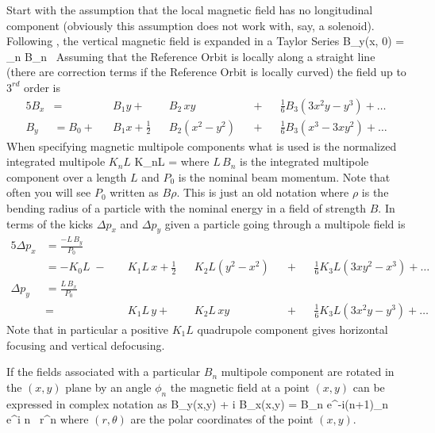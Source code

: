 Start with the assumption that the local magnetic field has no
longitudinal component (obviously this assumption does not work with,
say, a solenoid).  Following \mad, the vertical magnetic field is
expanded in a Taylor Series
\Begineq
  B_y(x, 0) = \sum_n B_n \, 
\Endeq
Assuming that the Reference Orbit is locally along a straight line
(there are correction terms if the Reference Orbit is locally curved) the 
field up to $3^{rd}$ order is
\begin{alignat}{5}
  B_x &=           &&B_1 y \plus         &&B_2 \, xy       && \plus && \frac{1}{6} B_3 (3x^2 y - y^3) \plus \ldots \\
  B_y &= B_0 \plus &&B_1 x + \frac{1}{2} &&B_2 (x^2 - y^2) && \plus && \frac{1}{6} B_3 (x^3 - 3x y^2) \plus \ldots
\end{alignat}
When specifying magnetic multipole components what is used is the
normalized integrated multipole $K_nL$
\Begineq
  K_nL = 
\Endeq
where $L \, B_n$ is the integrated multipole component over a length
$L$ and $P_0$ is the nominal beam momentum. Note that often you will see
$P_0$ written as $B\rho$. This is just an old notation where $\rho$
is the bending radius of a particle with the nominal energy in a field
of strength $B$. In terms of the kicks $\Delta p_x$ and $\Delta p_y$
given a particle going through a multipole field is
\begin{alignat}{5}
  \Delta p_x & = \frac{-L \, B_y}{P_0} \\
             & = -K_0 L \;-\; 
             && K_1 L \, x \plus 
             \frac{1}{2} && K_2 L (y^2 - x^2) && \plus 
             && \frac{1}{6} K_3 L (3x y^2 - x^3) \plus \ldots \nonumber \\
  \Delta p_y & = \frac{L \, B_x}{P_0} \\
             & =     
             && K_1 L \, y \plus 
             && K_2 L \, xy && \plus 
             && \frac{1}{6} K_3L (3x^2 y - y^3) \plus \ldots \nonumber 
\end{alignat}
Note that in particular a positive $K_1L$ quadrupole component gives
horizontal focusing and vertical defocusing. 

If the fields associated with a particular $B_n$ multipole component
are rotated in the $(x, y)$ plane by an angle $\phi_n$ the magnetic
field at a point $(x,y)$ can be expressed in complex notation as
\Begineq
  B_y(x,y) + i B_x(x,y) = 
                 B_n e^{-i(n+1)\phi_n} \, e^{i n \theta} \, r^n 
\Endeq
where $(r, \theta)$ are the polar coordinates of the point $(x, y)$.

